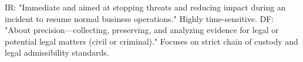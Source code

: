 IR: "Immediate and aimed at stopping threats and reducing impact during an incident to resume normal business operations." Highly time-sensitive.
DF: "About precision—collecting, preserving, and analyzing evidence for legal or potential legal matters (civil or criminal)." Focuses on strict chain of custody and legal admissibility standards.